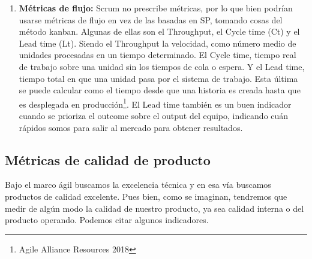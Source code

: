 \begin{enumerate}
\item {\textbf{Métricas de flujo:} Scrum no prescribe métricas, por lo que bien podrían usarse métricas de flujo en vez de las basadas en SP, tomando cosas del método kanban. Algunas de ellas son el Throughput, el Cycle time (Ct) y el Lead time (Lt). Siendo el Throughput la velocidad, como número medio de unidades procesadas en un tiempo determinado. El Cycle time, tiempo real de trabajo sobre una unidad sin los tiempos de cola o espera. Y el Lead time, tiempo total en que una unidad pasa por el sistema de trabajo. Esta última se puede calcular como el tiempo desde que una historia es creada hasta que es desplegada en producción\footnote{Agile Alliance Resources 2018}.  El Lead time también es un buen indicador cuando se prioriza el outcome sobre el output del equipo, indicando cuán rápidos somos para salir al mercado para obtener resultados.
}

\end{enumerate}

\subsection{Métricas de calidad de producto}

Bajo el marco ágil buscamos la excelencia técnica y en esa vía buscamos productos de calidad excelente. Pues bien, como se imaginan, tendremos que medir de algún modo la calidad de nuestro producto, ya sea calidad interna o del producto operando. Podemos citar algunos indicadores.

